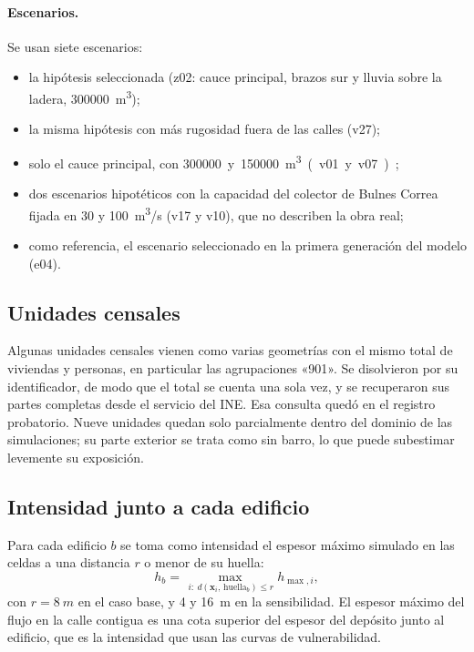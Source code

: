 \documentclass[10pt,a4paper]{article}
\begin{document}
\paragraph{Escenarios.} Se usan siete escenarios:
\begin{itemize}
\item la hipótesis seleccionada (z02: cauce principal, brazos sur y lluvia sobre la ladera, \SI{300000}{m^3});
\item la misma hipótesis con más rugosidad fuera de las calles (v27);
\item solo el cauce principal, con \SI{300000} y \SI{150000}{m^3} (v01 y v07);
\item dos escenarios hipotéticos con la capacidad del colector de Bulnes Correa fijada en 30 y \SI{100}{m^3/s} (v17 y v10), que no describen la obra real;
\item como referencia, el escenario seleccionado en la primera generación del modelo (e04).
\end{itemize}

\subsection{Unidades censales}
Algunas unidades censales vienen como varias geometrías con el mismo total de viviendas y personas, en particular las agrupaciones «901». Se disolvieron por su identificador, de modo que el total se cuenta una sola vez, y se recuperaron sus partes completas desde el servicio del INE. Esa consulta quedó en el registro probatorio. Nueve unidades quedan solo parcialmente dentro del dominio de las simulaciones; su parte exterior se trata como sin barro, lo que puede subestimar levemente su exposición.

\subsection{Intensidad junto a cada edificio}
Para cada edificio $b$ se toma como intensidad el espesor máximo simulado en las celdas a una distancia $r$ o menor de su huella:
\begin{equation}
h_b=\max_{\,i:\ d(\mathbf x_i,\,\text{huella}_b)\le r} h_{\max,i},
\end{equation}
con $r=\SI{8}{m}$ en el caso base, y 4 y \SI{16}{m} en la sensibilidad. El espesor máximo del flujo en la calle contigua es una cota superior del espesor del depósito junto al edificio, que es la intensidad que usan las curvas de vulnerabilidad.
\end{document}
